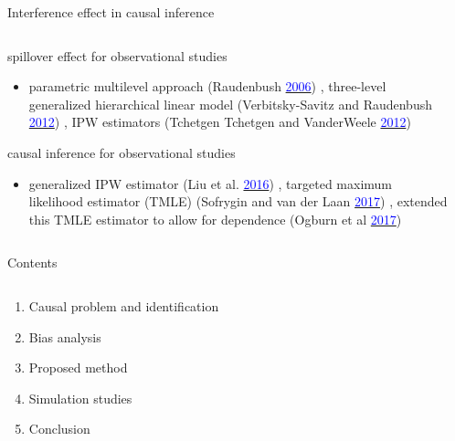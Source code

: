 \documentclass[notes,11pt, aspectratio=169]{beamer}
\begin{document}
\begin{frame}{Interference effect in causal inference}
\begin{columns}[T] %
\begin{column}{0.95\textwidth}
  \begin{wideitemize}
  \item spillover effect for observational studies 
  \begin{itemize}
      \item parametric multilevel approach (Raudenbush \href{https://www.tandfonline.com/doi/abs/10.1198/016214506000000447}{\textcolor{blue}{2006}}) , three-level generalized hierarchical linear model (Verbitsky-Savitz and Raudenbush \href{https://www.degruyter.com/document/doi/10.1515/2161-962X.1020/html?lang=en}{\textcolor{blue}{2012}}) , IPW estimators (Tchetgen Tchetgen and VanderWeele \href{https://www.ncbi.nlm.nih.gov/pmc/articles/PMC4216807/}{\textcolor{blue}{2012}})
  \end{itemize} 
  \item causal inference for observational studies
  \begin{itemize}
     \item generalized IPW estimator  (Liu et al. \href{https://www.ncbi.nlm.nih.gov/pmc/articles/PMC5793685/}{\textcolor{blue}{2016}}) , targeted maximum likelihood estimator (TMLE) (Sofrygin and van der Laan  \href{https://www.ncbi.nlm.nih.gov/pmc/articles/PMC5650205/}{\textcolor{blue}{2017}}) , extended this TMLE estimator to allow for dependence (Ogburn et al \href{https://arxiv.org/abs/1705.08527}{\textcolor{blue}{2017}})
  \end{itemize}
  \end{wideitemize}
\end{column}%
\hfill%
\begin{column}{.38\textwidth}

\end{column}%
\end{columns}
\end{frame}













\begin{frame}{Contents}
\begin{columns}[T] %
\begin{column}{.8\textwidth}
  \begin{enumerate}[{Part} I.]
    \item Causal problem and identification
    \item Bias analysis
    \item Proposed method
    \item Simulation studies
    \item Conclusion
  \end{enumerate}
\end{column}
\end{columns}
\end{frame}
\end{document}
